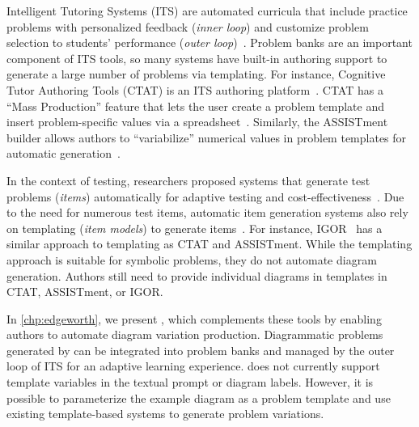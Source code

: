 Intelligent Tutoring Systems (ITS) are automated curricula that include practice problems with personalized feedback (\emph{inner loop}) and customize problem selection to students' performance (\emph{outer loop})~\cite{vanlehn_behavior_2006}. Problem banks are an important component of ITS tools, so many systems have built-in authoring support to generate a large number of problems via templating. For instance, Cognitive Tutor Authoring Tools (CTAT) is an ITS authoring platform~\cite{aleven_cognitive_2006}. CTAT has a ``Mass Production'' feature that lets the user create a problem template and insert problem-specific values via a spreadsheet~\cite{aleven_rapid_2006}. Similarly, the ASSISTment builder allows authors to ``variabilize'' numerical values in problem templates for automatic generation~\cite{ASSISTment}.  

In the context of testing, researchers proposed systems that generate test problems (\emph{items}) automatically for adaptive testing and cost-effectiveness~\cite{gierl2012automatic}.  Due to the need for numerous test items, automatic item generation systems also rely on templating (\emph{item models}) to generate items~\cite{gierl_role_2012,HOLLING200971,CheckIt}. For instance, IGOR~\cite[Chapter~13]{gierl2012automatic} has a similar approach to templating as CTAT and ASSISTment. While the templating approach is suitable for symbolic problems, they do not automate diagram generation. Authors still need to provide individual diagrams in templates in CTAT, ASSISTment, or IGOR. 

In \cref{chp:edgeworth}, we present \Edgeworth, which complements these tools by enabling authors to automate diagram variation production. Diagrammatic problems generated by \Edgeworth can be integrated into problem banks and managed by the outer loop of ITS for an adaptive learning experience. \Edgeworth does not currently support template variables in the textual prompt or diagram labels. However, it is possible to parameterize the example diagram as a problem template and use existing template-based systems to generate problem variations. 

